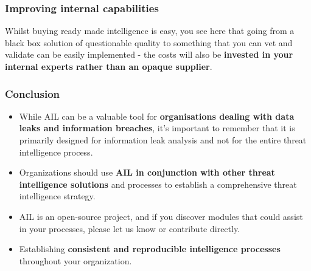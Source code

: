 \documentclass{beamer}
\begin{document}
\begin{frame}
    \frametitle{Improving internal capabilities}
    \begin{center}
        {\large Whilst buying ready made intelligence is easy, you see here that going from a black box solution of questionable quality to something that you can vet and validate can be easily implemented - the costs will also be {\bf invested in your internal experts rather than an opaque supplier}.}
    \end{center}
\end{frame}

\begin{frame}
    \frametitle{Conclusion}
\begin{itemize}
    \item While AIL can be a valuable tool for {\bf organisations dealing with data leaks and information breaches}, it's important to remember that it is primarily designed for information leak analysis and not for the entire threat intelligence process.
    \item Organizations should use \textbf{AIL in conjunction with other threat intelligence solutions} and processes to establish a comprehensive threat intelligence strategy.
    \item AIL is an open-source project, and if you discover modules that could assist in your processes, please let us know or contribute directly.
    \item Establishing {\bf consistent and reproducible intelligence processes} throughout your organization.
\end{itemize}
\end{frame}
\end{document}
